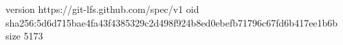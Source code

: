 version https://git-lfs.github.com/spec/v1
oid sha256:5d6d715bae4fa43f4385329c2d498f924b8ed0ebefb71796c67fd6b417ee1b6b
size 5173
